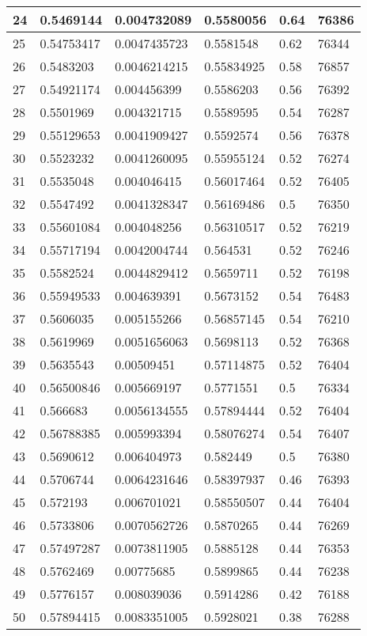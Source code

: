 \begin{longtable}{|l|l|l|l|l|l|}
24 & 0.5469144 & 0.004732089 & 0.5580056 & 0.64 & 76386 \\ \hline 
25 & 0.54753417 & 0.0047435723 & 0.5581548 & 0.62 & 76344 \\ \hline 
26 & 0.5483203 & 0.0046214215 & 0.55834925 & 0.58 & 76857 \\ \hline 
27 & 0.54921174 & 0.004456399 & 0.5586203 & 0.56 & 76392 \\ \hline 
28 & 0.5501969 & 0.004321715 & 0.5589595 & 0.54 & 76287 \\ \hline 
29 & 0.55129653 & 0.0041909427 & 0.5592574 & 0.56 & 76378 \\ \hline 
30 & 0.5523232 & 0.0041260095 & 0.55955124 & 0.52 & 76274 \\ \hline 
31 & 0.5535048 & 0.004046415 & 0.56017464 & 0.52 & 76405 \\ \hline 
32 & 0.5547492 & 0.0041328347 & 0.56169486 & 0.5 & 76350 \\ \hline 
33 & 0.55601084 & 0.004048256 & 0.56310517 & 0.52 & 76219 \\ \hline 
34 & 0.55717194 & 0.0042004744 & 0.564531 & 0.52 & 76246 \\ \hline 
35 & 0.5582524 & 0.0044829412 & 0.5659711 & 0.52 & 76198 \\ \hline 
36 & 0.55949533 & 0.004639391 & 0.5673152 & 0.54 & 76483 \\ \hline 
37 & 0.5606035 & 0.005155266 & 0.56857145 & 0.54 & 76210 \\ \hline 
38 & 0.5619969 & 0.0051656063 & 0.5698113 & 0.52 & 76368 \\ \hline 
39 & 0.5635543 & 0.00509451 & 0.57114875 & 0.52 & 76404 \\ \hline 
40 & 0.56500846 & 0.005669197 & 0.5771551 & 0.5 & 76334 \\ \hline 
41 & 0.566683 & 0.0056134555 & 0.57894444 & 0.52 & 76404 \\ \hline 
42 & 0.56788385 & 0.005993394 & 0.58076274 & 0.54 & 76407 \\ \hline 
43 & 0.5690612 & 0.006404973 & 0.582449 & 0.5 & 76380 \\ \hline 
44 & 0.5706744 & 0.0064231646 & 0.58397937 & 0.46 & 76393 \\ \hline 
45 & 0.572193 & 0.006701021 & 0.58550507 & 0.44 & 76404 \\ \hline 
46 & 0.5733806 & 0.0070562726 & 0.5870265 & 0.44 & 76269 \\ \hline 
47 & 0.57497287 & 0.0073811905 & 0.5885128 & 0.44 & 76353 \\ \hline 
48 & 0.5762469 & 0.00775685 & 0.5899865 & 0.44 & 76238 \\ \hline 
49 & 0.5776157 & 0.008039036 & 0.5914286 & 0.42 & 76188 \\ \hline 
50 & 0.57894415 & 0.0083351005 & 0.5928021 & 0.38 & 76288 \\ \hline 
\end{longtable}